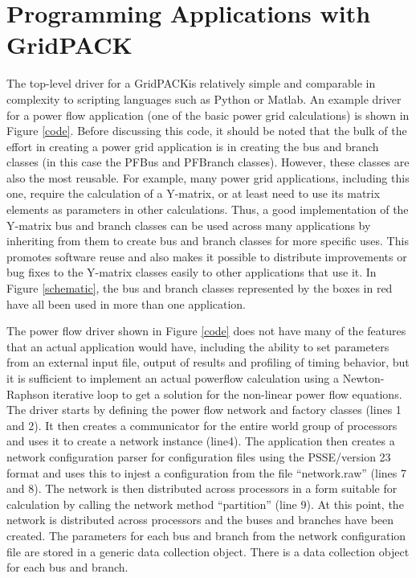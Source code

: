 \documentclass[preprint]{acm_proc_article-sp}
\begin{document}
\section{Programming Applications with GridPACK\texttrademark}
The top-level driver for a GridPACK\texttrademark is relatively simple and
comparable in complexity to scripting languages such as Python or Matlab. An
example driver for a power flow application (one of the basic power grid
calculations) is shown in Figure \ref{code}. Before discussing this code, it
should be noted that the bulk of the effort in creating a power grid application
is in creating the bus and branch classes (in this case the PFBus and PFBranch
classes). However, these classes are also the most reusable. For example, many
power grid applications, including this one, require the calculation of a
Y-matrix, or at least need to use its matrix elements as parameters in other
calculations. Thus, a good implementation of the Y-matrix bus and branch classes
can be used across many applications by inheriting from them to create
bus and branch classes for more specific uses. This promotes software reuse and
also makes it possible to distribute improvements or bug fixes to the Y-matrix
classes easily to other applications that use it. In Figure \ref{schematic}, the
bus and branch classes represented by the boxes in red have all been used in
more than one application.

The power flow driver shown in Figure \ref{code} does not have many of the
features that an actual application would have, including the ability to set
parameters
from an external input file, output of results and profiling of timing behavior,
but it is sufficient to implement an actual powerflow calculation using
a Newton-Raphson iterative loop to get a solution for the non-linear power flow
equations. The driver starts by defining the power
flow network and factory classes (lines 1 and 2). It then creates a communicator
for the entire world group of processors and uses it to create a network
instance (line4). The application then creates a network configuration parser
for configuration files using the PSSE/version 23 format and uses this to injest
a configuration from the file ``network.raw'' (lines 7 and 8). The network is then
distributed across processors in a form suitable for calculation by calling the
network method ``partition'' (line 9). At this point, the network is distributed
across
processors and the buses and branches have been created. The parameters for each
bus and branch from the network configuration file are stored in a generic data
collection object. There is a data collection object for each bus and branch.
\end{document}
